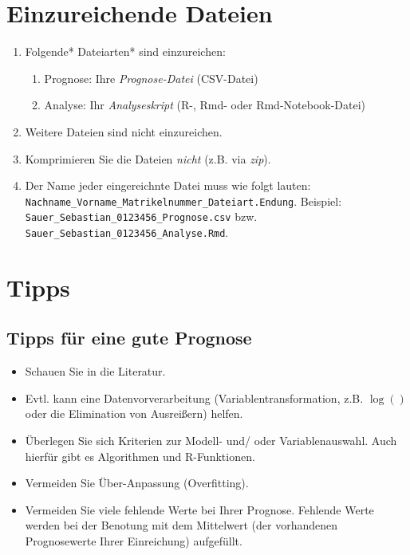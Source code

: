 \documentclass[
]{book}
\providecommand{\tightlist}{%
  \setlength{\itemsep}{0pt}\setlength{\parskip}{0pt}}
\begin{document}
\hypertarget{einzureichende-dateien}{%
\section{Einzureichende Dateien}\label{einzureichende-dateien}}

\begin{enumerate}
\def\labelenumi{\arabic{enumi}.}
\item
  Folgende* Dateiarten* sind einzureichen:

  \begin{enumerate}
  \def\labelenumii{\arabic{enumii}.}
  \tightlist
  \item
    Prognose: Ihre \emph{Prognose-Datei} (CSV-Datei)
  \item
    Analyse: Ihr \emph{Analyseskript} (R-, Rmd- oder Rmd-Notebook-Datei)
  \end{enumerate}
\item
  Weitere Dateien sind nicht einzureichen.
\item
  Komprimieren Sie die Dateien \emph{nicht} (z.B. via \emph{zip}).
\item
  Der Name jeder eingereichnte Datei muss wie folgt lauten: \texttt{Nachname\_Vorname\_Matrikelnummer\_Dateiart.Endung}. Beispiel: \texttt{Sauer\_Sebastian\_0123456\_Prognose.csv} bzw. \texttt{Sauer\_Sebastian\_0123456\_Analyse.Rmd}.
\end{enumerate}

\hypertarget{tipps}{%
\section{Tipps}\label{tipps}}

\hypertarget{tipps-fuxfcr-eine-gute-prognose}{%
\subsection{Tipps für eine gute Prognose}\label{tipps-fuxfcr-eine-gute-prognose}}

\begin{itemize}
\item
  Schauen Sie in die Literatur.
\item
  Evtl. kann eine Datenvorverarbeitung (Variablentransformation, z.B. \(\log()\) oder die Elimination von Ausreißern) helfen.
\item
  Überlegen Sie sich Kriterien zur Modell- und/ oder Variablenauswahl. Auch hierfür gibt es Algorithmen und R-Funktionen.
\item
  Vermeiden Sie Über-Anpassung (Overfitting).
\item
  Vermeiden Sie viele fehlende Werte bei Ihrer Prognose. Fehlende Werte werden bei der Benotung mit dem Mittelwert (der vorhandenen Prognosewerte Ihrer Einreichung) aufgefüllt.
\end{itemize}
\end{document}
